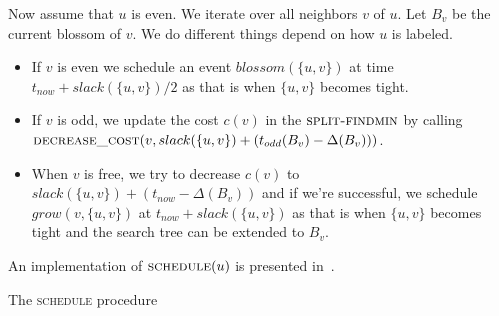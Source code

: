 Now assume that $u$ is even. We iterate over all neighbors $v$ of $u$. Let $B_v$ be the current blossom of 
$v$. We do different things depend on how $u$ is labeled.
\begin{itemize}
    \item If $v$ is even we schedule an event $blossom(\{u, v\})$ at time $t_{now} + slack(\{u, v\})/2$ as that is when $\{u, v\}$ becomes tight.
    \item If $v$ is odd, we update the cost $c(v)$ in the $\textsc{split-findmin}$ by calling $\textsc{decrease\_cost}(v, slack(\{u, v\}) + (t_{odd}(B_v) - \Delta(B_v)))$.
    \item When $v$ is free, we try to decrease $c(v)$ to $slack(\{u, v\}) + (t_{now} - \Delta(B_v))$ and if we're successful, we schedule $grow(v, \{u, v\})$ at $t_{now} + slack(\{u, v\})$ as that is when $\{u, v\}$ becomes tight and the search tree can be extended to $B_v$.
\end{itemize}

An implementation of $\textsc{schedule}(u)$ is presented in~.

\begin{algorithm}
\caption{The \textsc{schedule} procedure}\label{alg:schedule}
\begin{algorithmic}[1]
    \EndIf
    \Else
    \EndIf
\Else {}
        \EndIf
        \Else
            \EndIf
        \EndIf
    \EndFor
\EndIf
\EndProcedure
\end{algorithmic}
\end{algorithm}

